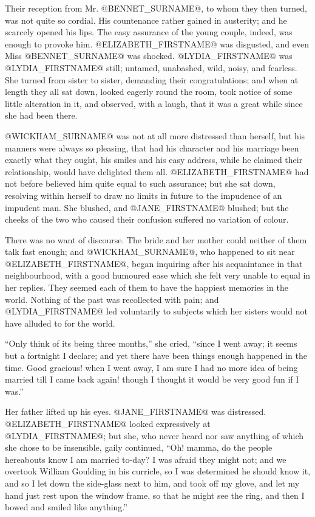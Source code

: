 Their reception from Mr. @BENNET_SURNAME@, to whom they then turned, was not quite
so cordial. His countenance rather gained in austerity; and he scarcely
opened his lips. The easy assurance of the young couple, indeed, was
enough to provoke him. @ELIZABETH_FIRSTNAME@ was disgusted, and even Miss @BENNET_SURNAME@
was shocked. @LYDIA_FIRSTNAME@ was @LYDIA_FIRSTNAME@ still; untamed, unabashed, wild, noisy,
and fearless. She turned from sister to sister, demanding their
congratulations; and when at length they all sat down, looked eagerly
round the room, took notice of some little alteration in it, and
observed, with a laugh, that it was a great while since she had been
there.

@WICKHAM_SURNAME@ was not at all more distressed than herself, but his manners
were always so pleasing, that had his character and his marriage been
exactly what they ought, his smiles and his easy address, while he
claimed their relationship, would have delighted them all. @ELIZABETH_FIRSTNAME@ had
not before believed him quite equal to such assurance; but she sat down,
resolving within herself to draw no limits in future to the impudence
of an impudent man. She blushed, and @JANE_FIRSTNAME@ blushed; but the cheeks of the
two who caused their confusion suffered no variation of colour.

There was no want of discourse. The bride and her mother could neither
of them talk fast enough; and @WICKHAM_SURNAME@, who happened to sit near
@ELIZABETH_FIRSTNAME@, began inquiring after his acquaintance in that neighbourhood,
with a good humoured ease which she felt very unable to equal in her
replies. They seemed each of them to have the happiest memories in the
world. Nothing of the past was recollected with pain; and @LYDIA_FIRSTNAME@ led
voluntarily to subjects which her sisters would not have alluded to for
the world.

``Only think of its being three months,'' she cried, ``since I went away;
it seems but a fortnight I declare; and yet there have been things
enough happened in the time. Good gracious! when I went away, I am sure
I had no more idea of being married till I came back again! though I
thought it would be very good fun if I was.''

Her father lifted up his eyes. @JANE_FIRSTNAME@ was distressed. @ELIZABETH_FIRSTNAME@ looked
expressively at @LYDIA_FIRSTNAME@; but she, who never heard nor saw anything of
which she chose to be insensible, gaily continued, ``Oh! mamma, do the
people hereabouts know I am married to-day? I was afraid they might not;
and we overtook William Goulding in his curricle, so I was determined he
should know it, and so I let down the side-glass next to him, and took
off my glove, and let my hand just rest upon the window frame, so that
he might see the ring, and then I bowed and smiled like anything.''

